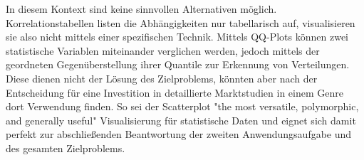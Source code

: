 \documentclass[usegeometry=true]{scrartcl}
\begin{document}
In diesem Kontext sind keine sinnvollen Alternativen möglich. 
Korrelationstabellen listen die Abhängigkeiten nur tabellarisch auf, visualisieren sie also nicht mittels einer spezifischen Technik.
Mittels QQ-Plots können zwei statistische Variablen miteinander verglichen werden, jedoch mittels der geordneten Gegenüberstellung ihrer Quantile zur Erkennung von Verteilungen.
Diese dienen nicht der Lösung des Zielproblems, könnten aber nach der Entscheidung für eine Investition in detaillierte Marktstudien in einem Genre dort Verwendung finden.
So sei der Scatterplot "the most versatile, polymorphic, and generally useful"\cite[103]{Friendly.2005} Visualisierung für statistische Daten und eignet sich damit perfekt zur abschließenden Beantwortung der zweiten Anwendungsaufgabe und des gesamten Zielproblems.




\end{document}
